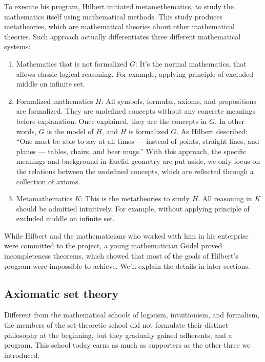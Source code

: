 \documentclass[b5paper]{article}
\begin{document}
To execute his program, Hilbert initiated metamethematics, to study the mathematics itself using mathematical methods. This study produces metatheories, which are mathematical theories about other mathematical theories. Such approach actually differentiates three different mathematical systems:

\begin{enumerate}
\item Mathematics that is not formalized $G$: It's the normal mathematics, that allows classic logical reasoning. For example, applying principle of excluded middle on infinite set.

\item Formalized mathematics $H$: All symbols, formulas, axioms, and propositions are formalized. They are undefined concepts without any concrete meanings before explanation. Once explained, they are the concepts in $G$. In other words, $G$ is the model of $H$, and $H$ is formalized $G$. As Hilbert described: ``One must be able to say at all times — instead of points, straight lines, and planes — tables, chairs, and beer mugs.'' With this approach, the specific meanings and background in Euclid geometry are put aside, we only focus on the relations between the undefined concepts, which are reflected through a collection of axioms.

\item Metamathematics $K$: This is the metatheories to study $H$. All reasoning in $K$ should be admitted intuitively. For example, without applying principle of excluded middle on infinite set.
\end{enumerate}

While Hilbert and the mathematicians who worked with him in his enterprise were committed to the project, a young mathematician Gödel proved incompleteness theorems, which showed that most of the goals of Hilbert's program were impossible to achieve. We'll explain the details in later sections.

\subsection{Axiomatic set theory}

Different from the mathematical schools of logicism, intuitionism, and formalism, the members of the set-theoretic school did not formulate their distinct philosophy at the beginning, but they gradually gained adherents, and a program. This school today earns as much as supporters as the other three we introduced.
\end{document}
